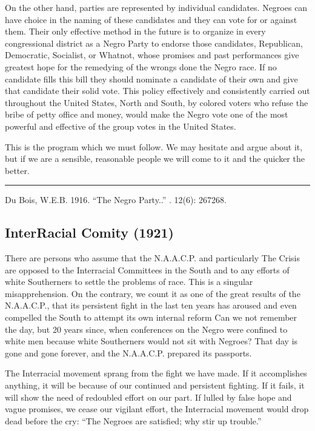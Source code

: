 \documentclass[letterpaper,10pt,english]{jupyterBook}
\begin{document}
\sphinxAtStartPar
On the other hand, parties are represented by individual candidates. Negroes can have choice in the naming of these candidates and they can vote for or against them. Their only effective method in the future is to organize in every congressional district as a Negro Party to endorse those candidates, Republican, Democratic, Socialist, or What\sphinxhyphen{}not, whose promises and past performances give greatest hope for the remedying of the wrongs done the Negro race. If no candidate fills this bill they should nominate a candidate of their own and give that candidate their solid vote. This policy effectively and consistently carried out throughout the United States, North and South, by colored voters who refuse the bribe of petty office and money, would make the Negro vote one of the most powerful and effective of the group votes in the United States.

\sphinxAtStartPar
This is the program which we must follow. We may hesitate and argue about it, but if we are a sensible, reasonable people we will come to it and the quicker the better.


\bigskip\hrule\bigskip


\sphinxAtStartPar
{} Du Bois, W.E.B. 1916. “The Negro Party..” . 12(6): 267\sphinxhyphen{}268.


\subsection{Inter\sphinxhyphen{}Racial Comity (1921)}
\label{\detokenize{Volumes/22/01/inter-racial_comity:inter-racial-comity-1921}}\label{\detokenize{Volumes/22/01/inter-racial_comity::doc}}
\sphinxAtStartPar
There are persons who assume that the N.A.A.C.P. and particularly The Crisis are opposed to the Inter\sphinxhyphen{}racial Committees in the South and to any efforts of white Southerners to settle the problems of race. This is a singu­lar misapprehension. On the contrary, we count it as one of the great results of the N.A.A.C.P., that its persistent fight in the last ten years has aroused and even compelled the South to attempt its own internal reform Can we not remember the day, but 20 years since, when conferences on the Negro were confined to white men because white Southerners would not sit with Negroes? That day is gone and gone forever, and the N.A.A.C.P. prepared its passports.

\sphinxAtStartPar
The Inter\sphinxhyphen{}racial movement sprang from the fight we have made. If it accomplishes anything, it will be because of our continued and persistent fighting. If it fails, it will show the need of redoubled effort on our part. If lulled by false hope and vague promises, we cease our vigilant effort, the Inter\sphinxhyphen{}racial movement would drop dead before the cry: “The Negroes are satisfied; why stir up trouble.”
\end{document}
